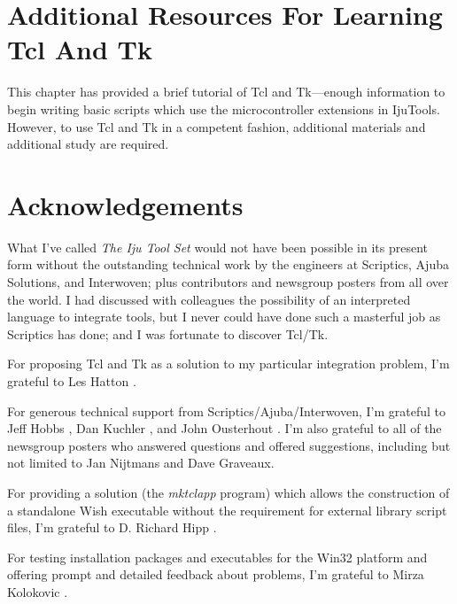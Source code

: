 \section{Additional Resources For Learning Tcl And Tk}

This chapter has provided a brief tutorial of Tcl and Tk---enough
information to begin writing basic scripts which use the microcontroller
extensions in IjuTools.  However, to use Tcl and Tk in a competent
fashion, additional materials and additional study are required.




\section{Acknowledgements}

What I've called \emph{The Iju Tool Set} would not have been possible in
its present form without the outstanding technical work by the engineers
at Scriptics, Ajuba Solutions, and Interwoven; plus contributors and
newsgroup posters from all over the world.  I had discussed with colleagues
the possibility of an interpreted language to integrate tools, but I never
could have done such a masterful job as Scriptics has done; and I was fortunate
to discover Tcl/Tk.

For proposing Tcl and Tk as a solution to my particular integration
problem, I'm grateful to Les Hatton \cite{bibref:i:leshatton}.  

For generous
technical support from Scriptics/Ajuba/Interwoven, I'm grateful to 
Jeff Hobbs \cite{bibref:i:jeffreyhobbs}, Dan Kuchler \cite{bibref:i:dankuchler}, 
and John Ousterhout \cite{bibref:i:johnousterhout}.
I'm also grateful to all of the newsgroup posters who 
answered questions and offered suggestions, including
but not limited to Jan Nijtmans and Dave Graveaux.

For providing a solution (the \emph{mktclapp} program) which allows
the construction of a standalone Wish executable without the
requirement for external library script files, I'm grateful to
D. Richard Hipp \cite{bibref:i:drichardhipp}.

For testing installation packages and executables for the 
Win32 platform and offering
prompt and detailed feedback about problems, I'm grateful to
Mirza Kolokovic \cite{bibref:i:mirzakolakovic}.


